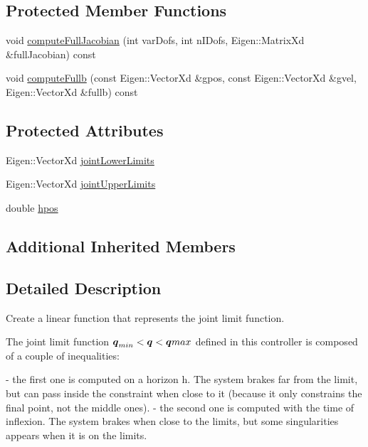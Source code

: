 \subsection*{Protected Member Functions}
\begin{DoxyCompactItemize}
\item 
void \hyperlink{classocra_1_1JointLimitFunction_a0ef515cc395c59313a60ae497528b52e}{compute\+Full\+Jacobian} (int var\+Dofs, int n\+I\+Dofs, Eigen\+::\+Matrix\+Xd \&full\+Jacobian) const
\item 
void \hyperlink{classocra_1_1JointLimitFunction_a254ef5b5095410a802976c95f04fe0a4}{compute\+Fullb} (const Eigen\+::\+Vector\+Xd \&gpos, const Eigen\+::\+Vector\+Xd \&gvel, Eigen\+::\+Vector\+Xd \&fullb) const
\end{DoxyCompactItemize}
\subsection*{Protected Attributes}
\begin{DoxyCompactItemize}
\item 
Eigen\+::\+Vector\+Xd \hyperlink{classocra_1_1JointLimitFunction_ab0dbcf53e97b8f4b7a56478bd09240f1}{joint\+Lower\+Limits}
\item 
Eigen\+::\+Vector\+Xd \hyperlink{classocra_1_1JointLimitFunction_a8ea9cd9be8cc3eb55d7d988ba8c5f7e4}{joint\+Upper\+Limits}
\item 
double \hyperlink{classocra_1_1JointLimitFunction_affab56a4cc60a886b51c2ef0644d44ba}{hpos}
\end{DoxyCompactItemize}
\subsection*{Additional Inherited Members}


\subsection{Detailed Description}
Create a linear function that represents the joint limit function. 

The joint limit function $ \mbox{\boldmath${q}$}_{min} < \mbox{\boldmath${q}$} < \mbox{\boldmath${q}$}{max} $ defined in this controller is composed of a couple of inequalities\+: \begin{DoxyVerb} - the first one is computed on a horizon h. The system brakes far from the limit, but can pass inside the constraint when close to it (because it only constrains the final point, not the middle ones).
 - the second one is computed with the time of inflexion. The system brakes when close to the limits, but some singularities appears when it is on the limits.
\end{DoxyVerb}


